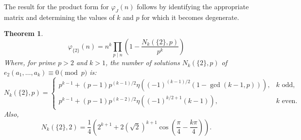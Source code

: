 \documentclass[12pt]{article}
\newtheorem{thm}{Theorem}[subsection]%
\begin{document}
The result for the product form for $\varphi_J(n)$ follows by identifying the appropriate matrix and determining the values of $k$ and $p$ for which it becomes degenerate.

\begin{thm}\label{thm: e2}
    \[
    \varphi_{\{2\}}(n)=n^k\prod_{p\mid n}\left(1-\frac{N_k(\{2\},p)}{p^k}\right)
    \]
    Where,
    for prime $p>2$ and $k>1$, the number of solutions $N_k(\{2\},p)$ of $e_2(a_1,\dots, a_k)\equiv 0\pmod{p}$ is:
    $$
    N_k(\{2\},p)=\begin{cases}
        p^{k-1}+(p-1)p^{(k-1)/2}\eta((-1)^{(k-1)/2}(1-\gcd(k-1,p))), &k\text{ odd},\\
        p^{k-1}+(p-1)p^{(k-2)/2}\eta((-1)^{k/2+1}(k-1)), &k\text{ even}.
    \end{cases}
    $$
    Also,
    $$
    N_k(\{2\},2)=\frac{1}{4}\left(2^{k+1}+2(\sqrt{2})^{k+1}\cos\left(\frac{\pi}{4}-\frac{k\pi}{4}\right)\right).
    $$
\end{thm}
\end{document}
